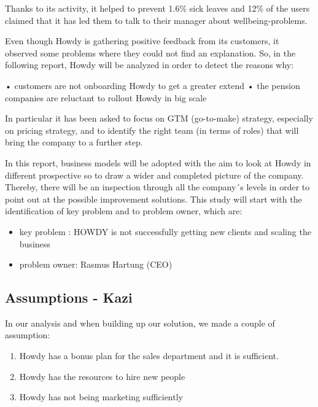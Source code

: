 \noindent Thanks to its activity, it helped to prevent 1.6\% sick leaves and 12\% of the users claimed that it has led them to talk to their manager about wellbeing-problems. \cite{howdywebsite}  

\noindent Even though Howdy is gathering positive feedback from its customers, it observed some problems where they could not find an explanation. So, in the following report, Howdy will be analyzed in order to detect the reasons why:

•	customers are not onboarding Howdy to get a greater extend
•	the pension companies are reluctant to rollout Howdy in big scale

\noindent In particular it has been asked to focus on GTM (go-to-make) strategy, especially on pricing strategy, and to identify the right team (in terms of roles) that will bring the company to a further step.\cite[s.39]{oneofthepresentations}

\noindent In this report, business models will be adopted with the aim to look at Howdy in different prospective so to draw a wider and completed picture of the company.  Thereby, there will be an inspection through all the company´s levels in order to point out at the possible improvement solutions. This study will start with the identification of key problem and to problem owner, which are:


\begin{itemize}
  \item key problem : HOWDY is not successfully getting new clients and scaling the business\cite[s.38]{oneofthepresentations}
  \item problem owner: Rasmus Hartung (CEO)\cite[s.5]{oneofthepresentations}
\end{itemize}





\subsection{Assumptions - Kazi}

In our analysis and when building up our solution, we made a couple of assumption:

\begin{enumerate}
    \item Howdy has a bonus plan for the sales department and it is sufficient.
    \item Howdy has the resources to hire new people 
    \item Howdy has not being marketing sufficiently 
\end{enumerate}

